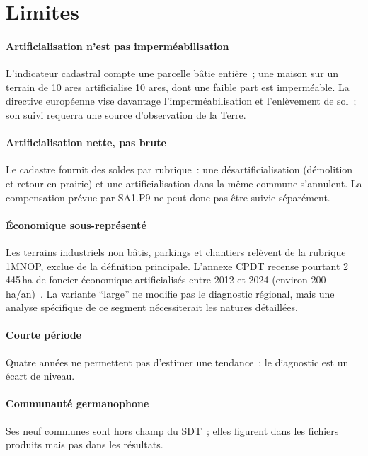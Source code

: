 \documentclass[11pt,a4paper]{report}
\newcommand{\ha}{\,ha}
\newcommand{\haan}{\,ha/an}
\begin{document}
\section{Limites}
\label{sec:limites}
\paragraph{Artificialisation n'est pas imperméabilisation} L'indicateur cadastral compte une parcelle bâtie entière~; une maison sur un terrain de 10 ares artificialise 10 ares, dont une faible part est imperméable. La directive européenne vise davantage l'imperméabilisation et l'enlèvement de sol~; son suivi requerra une source d'observation de la Terre.
\paragraph{Artificialisation nette, pas brute} Le cadastre fournit des soldes par rubrique~: une désartificialisation (démolition et retour en prairie) et une artificialisation dans la même commune s'annulent. La compensation prévue par SA1.P9 ne peut donc pas être suivie séparément.
\paragraph{Économique sous-représenté} Les terrains industriels non bâtis, parkings et chantiers relèvent de la rubrique 1MNOP, exclue de la définition principale. L'annexe CPDT recense pourtant 2\,445\ha{} de foncier économique artificialisés entre 2012 et 2024 (environ 200\haan)~\citep{cpdt2025}. La variante \enquote{large} ne modifie pas le diagnostic régional, mais une analyse spécifique de ce segment nécessiterait les natures détaillées.
\paragraph{Courte période} Quatre années ne permettent pas d'estimer une tendance~; le diagnostic est un écart de niveau.
\paragraph{Communauté germanophone} Ses neuf communes sont hors champ du SDT~; elles figurent dans les fichiers produits mais pas dans les résultats.
\end{document}
